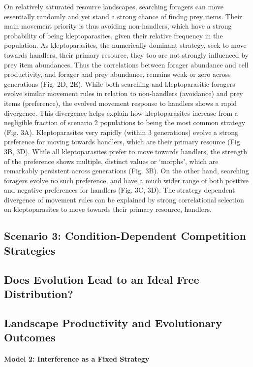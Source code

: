 \documentclass[11pt]{article}
\begin{document}
On relatively saturated resource landscapes, searching foragers can move essentially randomly and yet stand a strong chance of findng prey items.
Their main movement priority is thus avoiding non-handlers, which have a strong probability of being kleptoparasites, given their relative frequency in the population.
As kleptoparasites, the numerically dominant strategy, seek to move towards handlers, their primary resource, they too are not strongly influenced by prey item abundances.
Thus the correlations between forager abundance and cell productivity, and forager and prey abundance, remains weak or zero across generations (Fig. 2D, 2E).
While both searching and kleptoparasitic foragers evolve similar movement rules in relation to non-handlers (avoidance) and prey items (preference), the evolved movement response to handlers shows a rapid divergence.
This divergence helps explain how kleptoparasites increase from a negligible fraction of scenario 2 populations to being the most common strategy (Fig. 3A).
Kleptoparasites very rapidly (within 3 generations) evolve a strong preference for moving towards handlers, which are their primary resource (Fig. 3B, 3D).
While all kleptoparasites prefer to move towards handlers, the strength of the preference shows multiple, distinct values or `morphs', which are remarkably persistent across generations (Fig. 3B).
On the other hand, searching foragers evolve no such preference, and have a much wider range of both positive and negative preferences for handlers (Fig. 3C, 3D).
The strategy dependent divergence of movement rules can be explained by strong correlational selection on kleptoparasites to move towards their primary resource, handlers.

\subsection{Scenario 3: Condition-Dependent Competition Strategies}

\subsection{Does Evolution Lead to an Ideal Free Distribution?}

\subsection{Landscape Productivity and Evolutionary Outcomes}

\paragraph{Model 2: Interference as a Fixed Strategy}
\end{document}
